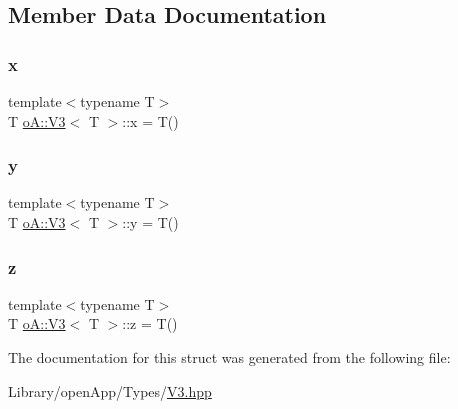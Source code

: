 \subsection{Member Data Documentation}
\mbox{\label{structo_a_1_1_v3_a2171113146a81277db6009a5c6af883f}} 
\subsubsection{\texorpdfstring{x}{x}}
{\footnotesize\ttfamily template$<$typename T$>$ \\
T \mbox{\hyperlink{structo_a_1_1_v3}{o\+A\+::\+V3}}$<$ T $>$\+::x = T()}

\mbox{\label{structo_a_1_1_v3_a04cf470d60a012fe0dc40a92c7ec9e73}} 
\subsubsection{\texorpdfstring{y}{y}}
{\footnotesize\ttfamily template$<$typename T$>$ \\
T \mbox{\hyperlink{structo_a_1_1_v3}{o\+A\+::\+V3}}$<$ T $>$\+::y = T()}

\mbox{\label{structo_a_1_1_v3_a30e27d6464ac2143637bfc675a1e5dd7}} 
\subsubsection{\texorpdfstring{z}{z}}
{\footnotesize\ttfamily template$<$typename T$>$ \\
T \mbox{\hyperlink{structo_a_1_1_v3}{o\+A\+::\+V3}}$<$ T $>$\+::z = T()}



The documentation for this struct was generated from the following file\+:\begin{DoxyCompactItemize}
\item 
Library/open\+App/\+Types/\mbox{\hyperlink{_v3_8hpp}{V3.\+hpp}}\end{DoxyCompactItemize}
